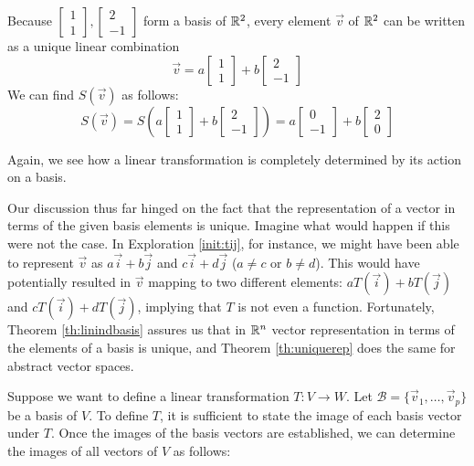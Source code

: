 \documentclass{ximera}
\begin{document}
\begin{exploration}
Because $\begin{bmatrix}1\\1\end{bmatrix},\begin{bmatrix}2\\-1\end{bmatrix}$ form a basis of $\mathbb{R}^2$, every element $\vec{v}$ of $\mathbb{R}^2$ can be written as a unique linear combination $$\vec{v}=a\begin{bmatrix}1\\1\end{bmatrix}+b\begin{bmatrix}2\\-1\end{bmatrix}$$
We can find $S(\vec{v})$ as follows:
$$S(\vec{v})=S\left(a\begin{bmatrix}1\\1\end{bmatrix}+b\begin{bmatrix}2\\-1\end{bmatrix}\right)=a\begin{bmatrix}0\\-1\end{bmatrix}+b\begin{bmatrix}2\\0\end{bmatrix}$$

Again, we see how a linear transformation is completely determined by its action on a basis.

\end{exploration}

Our discussion thus far hinged on the fact that the representation of a vector in terms of the given basis elements is unique.  Imagine what would happen if this were not the case.  In Exploration \ref{init:tij}, for instance, we might have been able to represent $\vec{v}$ as $a\vec{i}+b\vec{j}$ and $c\vec{i}+d\vec{j}$ ($a\neq c$ or $b\neq d$).  This would have potentially resulted in $\vec{v}$ mapping to two different elements: $aT(\vec{i})+bT(\vec{j})$ and $cT(\vec{i})+dT(\vec{j})$, implying that $T$ is not even a function.  Fortunately, Theorem \ref{th:linindbasis}  assures us that in $\mathbb{R}^n$ vector representation in terms of the elements of a basis is unique, and Theorem \ref{th:uniquerep} does the same for abstract vector spaces.

Suppose we want to define a linear transformation $T:V\rightarrow W$.  Let $\mathcal{B}=\{\vec{v}_1,\ldots,\vec{v}_p\}$ be a basis of $V$.  To define $T$, it is sufficient to state the image of each basis vector under $T$.  Once the images of the basis vectors are established, we can determine the images of all vectors of $V$ as follows:
\end{document}
